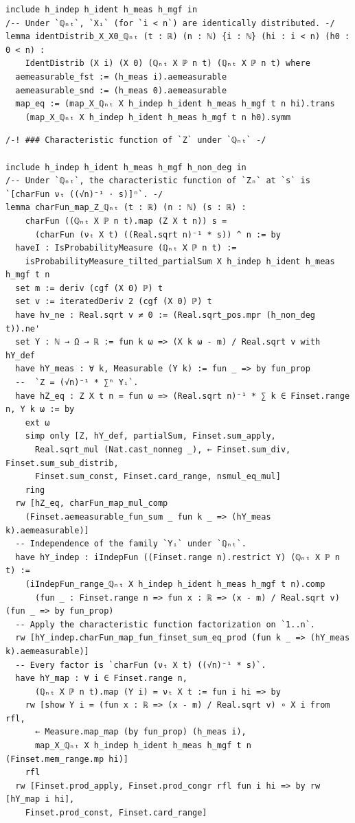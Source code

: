 \begin{lstlisting}
include h_indep h_ident h_meas h_mgf in
/-- Under `ℚₙₜ`, `Xᵢ` (for `i < n`) are identically distributed. -/
lemma identDistrib_X_X0_ℚₙₜ (t : ℝ) (n : ℕ) {i : ℕ} (hi : i < n) (h0 : 0 < n) :
    IdentDistrib (X i) (X 0) (ℚₙₜ X ℙ n t) (ℚₙₜ X ℙ n t) where
  aemeasurable_fst := (h_meas i).aemeasurable
  aemeasurable_snd := (h_meas 0).aemeasurable
  map_eq := (map_X_ℚₙₜ X h_indep h_ident h_meas h_mgf t n hi).trans
    (map_X_ℚₙₜ X h_indep h_ident h_meas h_mgf t n h0).symm

\end{lstlisting}
\newpage
\begin{lstlisting}
/-! ### Characteristic function of `Z` under `ℚₙₜ` -/

include h_indep h_ident h_meas h_mgf h_non_deg in
/-- Under `ℚₙₜ`, the characteristic function of `Zₙ` at `s` is `[charFun νₜ ((√n)⁻¹ · s)]ⁿ`. -/
lemma charFun_map_Z_ℚₙₜ (t : ℝ) (n : ℕ) (s : ℝ) :
    charFun ((ℚₙₜ X ℙ n t).map (Z X t n)) s =
      (charFun (νₜ X t) ((Real.sqrt n)⁻¹ * s)) ^ n := by
  haveI : IsProbabilityMeasure (ℚₙₜ X ℙ n t) :=
    isProbabilityMeasure_tilted_partialSum X h_indep h_ident h_meas h_mgf t n
  set m := deriv (cgf (X 0) ℙ) t
  set v := iteratedDeriv 2 (cgf (X 0) ℙ) t
  have hv_ne : Real.sqrt v ≠ 0 := (Real.sqrt_pos.mpr (h_non_deg t)).ne'
  set Y : ℕ → Ω → ℝ := fun k ω => (X k ω - m) / Real.sqrt v with hY_def
  have hY_meas : ∀ k, Measurable (Y k) := fun _ => by fun_prop
  --  `Z = (√n)⁻¹ * ∑ⁿ Yᵢ`.
  have hZ_eq : Z X t n = fun ω => (Real.sqrt n)⁻¹ * ∑ k ∈ Finset.range n, Y k ω := by
    ext ω
    simp only [Z, hY_def, partialSum, Finset.sum_apply,
      Real.sqrt_mul (Nat.cast_nonneg _), ← Finset.sum_div, Finset.sum_sub_distrib,
      Finset.sum_const, Finset.card_range, nsmul_eq_mul]
    ring
  rw [hZ_eq, charFun_map_mul_comp
    (Finset.aemeasurable_fun_sum _ fun k _ => (hY_meas k).aemeasurable)]
  -- Independence of the family `Yᵢ` under `ℚₙₜ`.
  have hY_indep : iIndepFun ((Finset.range n).restrict Y) (ℚₙₜ X ℙ n t) :=
    (iIndepFun_range_ℚₙₜ X h_indep h_ident h_meas h_mgf t n).comp
      (fun _ : Finset.range n => fun x : ℝ => (x - m) / Real.sqrt v) (fun _ => by fun_prop)
  -- Apply the characteristic function factorization on `1..n`.
  rw [hY_indep.charFun_map_fun_finset_sum_eq_prod (fun k _ => (hY_meas k).aemeasurable)]
  -- Every factor is `charFun (νₜ X t) ((√n)⁻¹ * s)`.
  have hY_map : ∀ i ∈ Finset.range n,
      (ℚₙₜ X ℙ n t).map (Y i) = νₜ X t := fun i hi => by
    rw [show Y i = (fun x : ℝ => (x - m) / Real.sqrt v) ∘ X i from rfl,
      ← Measure.map_map (by fun_prop) (h_meas i),
      map_X_ℚₙₜ X h_indep h_ident h_meas h_mgf t n (Finset.mem_range.mp hi)]
    rfl
  rw [Finset.prod_apply, Finset.prod_congr rfl fun i hi => by rw [hY_map i hi],
    Finset.prod_const, Finset.card_range]


\end{lstlisting}
